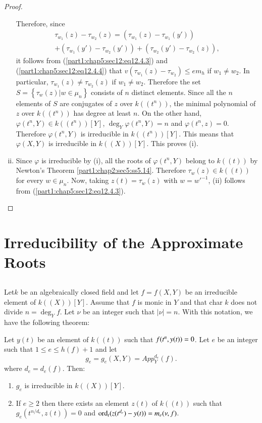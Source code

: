 \begin{proof}
\begin{enumerate}[(i)]
    Therefore, since
    \begin{multline*}
    \tau_{w_1} (z) - \tau_{w_2} (z) = (\tau_{w_1}(z) - \tau_{w_1}
    (y'))\\
    + (\tau_{w_1}(y')- \tau _{w_2} (y')) + (\tau_{w_2}(y')-
    \tau_{w_2}(z)),
    \end{multline*}
    it follows from (\ref{part1:chap5:sec12:eq12.4.3}) and
    (\ref{part1:chap5:sec12:eq12.4.4}) that $v(\tau_{w_1}(z)-
    \tau_{w_2})\leq em_h$ if $w_1 \neq w_2$. In particular,
    $\tau_{w_1} (z) \neq \tau_{w_2}(z)$ if $w_1 \neq w_2$. Therefore
    the set $S = \left\{ \tau_w (z) \Big| w \in \mu_n \right\}$
    consists of $n$ distinct elements. Since all the $n$ elements of
    $S$ are conjugates of $z$ over $k((t^n))$, the minimal polynomial
    of $z$ over $k((t^n))$ has degree at least $n$. On the other hand,
    $\varphi (t^n, Y) \in k((t^n))[Y]$, $\deg_Y \varphi(t^n, Y)=n$ and
    $\varphi(t^n, z)=0$. Therefore $\varphi (t^n, Y)$ is irreducible
    in $k((t^n)) [Y]$. This means that $\varphi (X, Y)$ is irreducible
    in $k((X))[Y]$. This proves (i).

\item Since $\varphi$ is irreducible by (i), all the roots of
  $\varphi(t^n, Y)$ belong to $k((t))$ by Newton's Theorem
  \ref{part1:chap2:sec5:ss5.14}. Therefore $\tau_w (z) \in k((t))$ for
  every $w \in \mu_n$. Now, taking $z(t) = \tau_w (z)$ with $w=
  w'^{-1}$, (ii) follows from (\ref{part1:chap5:sec12:eq12.4.3}).
  \end{enumerate}
\end{proof}

\section{Irreducibility of the Approximate
  Roots}\label{part1:chap5:sec13} 

\subsection{}\label{part1:chap5:sec13:ss13.1} 

Let\pageoriginale $k$ be an algebraically closed field and let $f=
f(X, Y)$ be an irreducible element of $k((X))[Y]$. Assume that $f$ is
monic in $Y$ and that char $k$ does not divide $n = \deg_Y f$. Let
$\nu$ be an integer such that $|\nu|=n$. With this notation, we have
the following theorem:
\setcounter{thm}{1}
\begin{thm}\label{part1:chap5:sec13:thm13.2} 
  Let $y(t)$ be an element of $k((t))$ such that $f(t^n,\break y(t))=0$. Let
  $e$ be an integer such that $1 \leq e \leq h(f)+1$ and let 
$$
g_e = g_e (X, Y)= App_Y ^{d_e} (f).
$$
where $d_e = d_e (f)$. Then:
\begin{enumerate}[\rm (i)]
\item $g_e$ is irreducible in $k((X))[Y]$.

\item If $e \geq 2$ then there exists an element $z(t)$ of $k((t))$
  such that\break  $g_e (t^{n/d_e}, z(t))=0$ and $\operatorname{ord}_t (z(t^{d_e})-
  y(t))=m_e (\nu, f)$.
\end{enumerate}
\end{thm}

